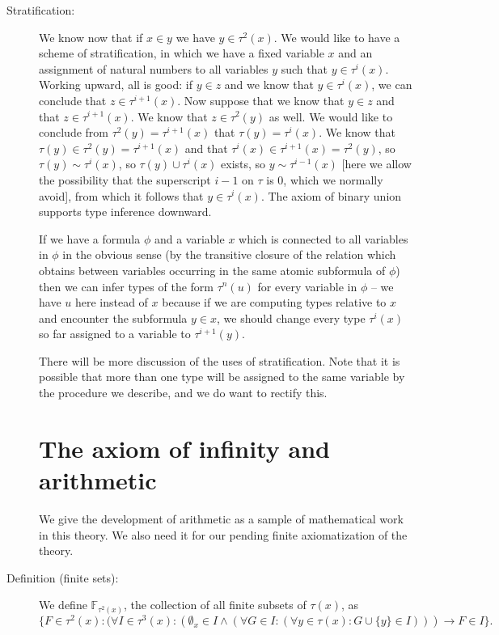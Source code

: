 \documentclass[12pt]{article}
\begin{document}
\begin{description}
\item[Stratification:]  We know now that if $x \in y$ we have $y \in \tau^2(x)$.   We would like to have a scheme of stratification, in which we have a fixed variable $x$
and an assignment of natural numbers to all variables $y$ such that $y \in \tau^i(x)$.  Working upward, all is good:  if $y \in z$ and we know that $y \in \tau^i(x)$, we can conclude
that $z \in \tau^{i+1}(x)$.  Now suppose that we know that $y \in z$ and that $z \in \tau^{i+1}(x)$.  We know that $z \in \tau^2(y)$ as well.   We would like to conclude
from $\tau^2(y) = \tau^{i+1}(x)$ that $\tau(y) = \tau^i(x)$.  We know that $\tau(y) \in \tau^2(y) = \tau^{i+1}(x)$ and that $\tau^i(x) \in \tau^{i+1}(x)=\tau^2(y)$, so
$\tau(y) \sim \tau^i(x)$, so $\tau(y) \cup \tau^i(x)$ exists, so  $y \sim \tau^{i-1}(x)$ [here we allow the possibility that the superscript $i-1$ on $\tau$ is 0, which we normally avoid], from which it follows
that $y \in \tau^i(x)$.  The axiom of binary union supports type inference downward.  

If we have a formula $\phi$ and a variable $x$ which is connected to all variables in $\phi$ in the obvious sense (by the transitive closure of the relation which obtains between variables occurring in the same atomic subformula of $\phi$) then we can infer types of the form $\tau^n(u)$ for every variable in $\phi$ -- we have $u$ here instead of $x$ because if we are computing types relative to $x$ and encounter the subformula $y \in x$, we should change every type $\tau^i(x)$ so far assigned to a variable to $\tau^{i+1}(y)$.

There will be more discussion of the uses of stratification.  Note that it is possible that more than one type will be assigned to the same variable by the procedure we describe, and we do want to rectify this.

\section{The axiom of infinity and arithmetic}

We give the development of arithmetic as a sample of mathematical work in this theory.  We also need it for our pending finite axiomatization of the theory.

\item[Definition (finite sets):]  We define $\mathbb F_{\tau^2(x)}$, the collection of all finite subsets of $\tau(x)$, as {\small $$\{F\in \tau^2(x):(\forall I \in \tau^3(x):(\emptyset_x \in I \wedge (\forall G \in I:(\forall y \in \tau(x):  G \cup \{y\} \in I))) \rightarrow F \in I\}.$$}


\end{description}
\end{document}
